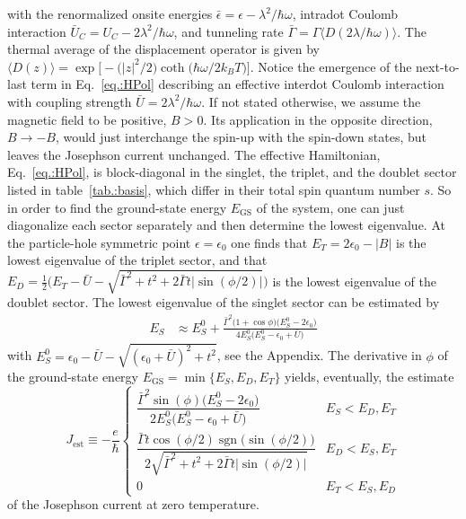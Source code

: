 \documentclass[aps,prb,twocolumn,superscriptaddress,amsmath,amssymb,longbibliography]{revtex4-1}
\newcommand{\ev}[1]{\ensuremath{\langle #1 \rangle}}
\newcommand{\abs}[1]{\ensuremath{|#1|}}
\newcommand{\sgn}{\ensuremath{\operatorname{sgn}}}
\begin{document}
	with the renormalized onsite energies $\bar\epsilon=\epsilon - \lambda^2/\hbar\omega$,
	intradot Coulomb interaction ${\bar U}_C=U_C-2 \lambda^2/\hbar\omega$,
	and tunneling rate $\bar\Gamma  =\Gamma \ev{D(2 \lambda/\hbar\omega)}$. 
	The thermal average of the displacement operator is given by~\cite{DominguezPRB2011a}
	$\ev{D(z)} =\exp\big[-\big(\abs{z}^2/2\big)\coth\big(\hbar\omega/2 k_BT\big)\big]$.
	Notice the  emergence of the next-to-last term in Eq.~\eqref{eq.:HPol} describing an effective interdot Coulomb interaction 
	with coupling strength $\bar U =2\lambda^2/\hbar\omega$. If not stated otherwise, we assume the magnetic field to be positive, $B>0$. 
	Its application in the opposite direction, $B\to-B$, would just interchange the spin-up with the spin-down states, but leaves the Josephson current unchanged. 
	The effective Hamiltonian, Eq.~\eqref{eq.:HPol}, is block-diagonal
	in the singlet, the triplet, and the doublet sector listed in table~\ref{tab.:basis}, which differ in their total spin quantum number $s$. So in order to find the ground-state energy $E_{\textrm{GS}}$ of the system, one can just diagonalize each sector separately and then
	determine the lowest eigenvalue. At the particle-hole symmetric point $\epsilon=\epsilon_0$ one finds that 
	$E_T=2\epsilon_0-\abs{B}$ is the lowest eigenvalue of the triplet sector, and that $E_D=\frac{1}{2}\big(E_T-\bar U -\sqrt{\bar\Gamma^2+t^2+2\bar\Gamma t \abs{\sin(\phi/2)}}\big)$ is the lowest eigenvalue of the doublet sector. The lowest eigenvalue of the singlet sector can be estimated by
	\begin{align}
	E_S &\approx E_S^0 + \frac{
		\bar\Gamma^2\big(1+\cos\phi\big)\big(E_S^0-2\epsilon_0\big)
	}{
		4E_S^0 \big(E_S^0 -\epsilon_0+ \bar U \big)
	} \label{eq.:ESApproxMainText}
	\end{align}
	with $E_{S}^0 =\epsilon_0-\bar U-\sqrt{(\epsilon_0+\bar U)^2+t^2}$, see the  Appendix.
	The derivative in $\phi$ of the ground-state energy $E_{\textrm{GS}} = \min\{E_S,E_D, E_T\}$ yields, eventually,
	the estimate
	\begin{equation}
		J_{\textrm{est}}{\equiv} -\frac{e}{\hbar}\begin{cases}
			\dfrac{
			\bar\Gamma^2 \sin(\phi)\big(E_S^0-2\epsilon_0\big)
			}{
			2E_S^0 \big(E_S^0 -\epsilon_0 + \bar U\big)
			} & E_S < E_D, E_T\\
			\dfrac{\bar\Gamma t\cos(\phi/2)\sgn\bm{(}\sin(\phi/2)\bm{)}}{2\sqrt{
			\bar\Gamma^2+t^2+ 2\bar\Gamma t\abs{\sin(\phi/2)}
			}} & E_D < E_S, E_T\\
			0 & E_T < E_S, E_D
		\end{cases}\label{eq.:JEst}
	\end{equation}
	of the Josephson current at zero temperature. 
	
\end{document}
